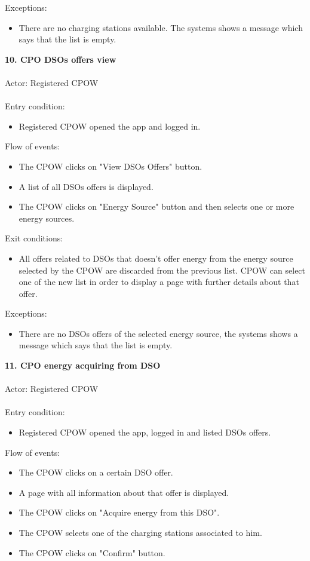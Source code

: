 \documentclass[a4paper]{report}
\begin{document}
Exceptions:
\begin{itemize}
\item There are no charging stations available. The systems shows a message which says that the list is empty.
\end{itemize}
\textbf{10. CPO DSOs offers view}\label{uc:8}
\\ \\
Actor: Registered CPOW \\ \\
Entry condition:
\begin{itemize}
\item Registered CPOW opened the app and logged in.
\end{itemize}
Flow of events:
\begin{itemize}
\item The CPOW clicks on "View DSOs Offers" button.
\item A list of all DSOs offers is displayed.
\item The CPOW clicks on "Energy Source" button and then selects one or more energy sources.
\end{itemize}
Exit conditions:
\begin{itemize}
\item All offers related to DSOs that doesn't offer energy from the energy source selected by the CPOW are discarded from the previous list. CPOW can select one of the new list in order to display a page with further details about that offer.
\end{itemize}
Exceptions:
\begin{itemize}
\item There are no DSOs offers of the selected energy source, the systems shows a message which says that the list is empty.
\end{itemize}
\textbf{11. CPO energy acquiring from DSO}\label{uc:8}
\\ \\
Actor: Registered CPOW \\ \\
Entry condition:
\begin{itemize}
\item Registered CPOW opened the app, logged in and listed DSOs offers.
\end{itemize}
Flow of events:
\begin{itemize}
\item The CPOW clicks on a certain DSO offer.
\item A page with all information about that offer is displayed.
\item The CPOW clicks on "Acquire energy from this DSO".
\item The CPOW selects one of the charging stations associated to him.
\item The CPOW clicks on "Confirm" button.
\end{itemize}
\end{document}
